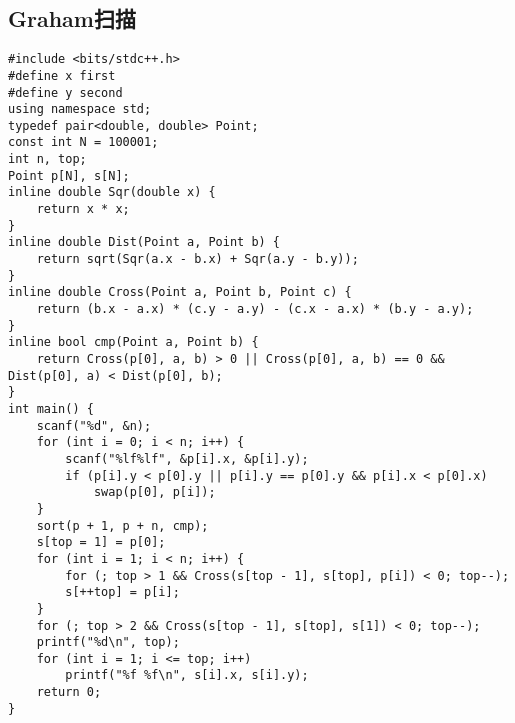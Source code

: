 \documentclass[a4paper]{article}
\begin{document}
\subsection{Graham扫描}
\begin{lstlisting}
#include <bits/stdc++.h>
#define x first
#define y second
using namespace std;
typedef pair<double, double> Point;
const int N = 100001;
int n, top;
Point p[N], s[N];
inline double Sqr(double x) {
    return x * x;
}
inline double Dist(Point a, Point b) {
    return sqrt(Sqr(a.x - b.x) + Sqr(a.y - b.y));
}
inline double Cross(Point a, Point b, Point c) {
    return (b.x - a.x) * (c.y - a.y) - (c.x - a.x) * (b.y - a.y);
}
inline bool cmp(Point a, Point b) {
    return Cross(p[0], a, b) > 0 || Cross(p[0], a, b) == 0 && Dist(p[0], a) < Dist(p[0], b);
}
int main() {
    scanf("%d", &n);
    for (int i = 0; i < n; i++) {
        scanf("%lf%lf", &p[i].x, &p[i].y);
        if (p[i].y < p[0].y || p[i].y == p[0].y && p[i].x < p[0].x)
            swap(p[0], p[i]);
    }
    sort(p + 1, p + n, cmp);
    s[top = 1] = p[0];
    for (int i = 1; i < n; i++) {
        for (; top > 1 && Cross(s[top - 1], s[top], p[i]) < 0; top--);
        s[++top] = p[i];
    }
    for (; top > 2 && Cross(s[top - 1], s[top], s[1]) < 0; top--);
    printf("%d\n", top);
    for (int i = 1; i <= top; i++)
        printf("%f %f\n", s[i].x, s[i].y);
    return 0;
}
\end{lstlisting}
\end{document}
